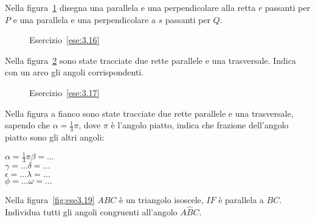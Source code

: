 \begin{esercizio}
\label{ese:3.16}
Nella figura~\ref{fig:ese3.16} disegna una parallela e una 
perpendicolare alla retta $r$ passanti per $P$ e una parallela e una 
perpendicolare a $s$ passanti per $Q$.
\end{esercizio}

\begin{inaccessibleblock}
 \begin{figure}[htb]
\centering
\caption{Esercizio~\ref{ese:3.16}}\label{fig:ese3.16}
\end{figure}
\end{inaccessibleblock}

\begin{esercizio}
\label{ese:3.17}
Nella figura~\ref{fig:ese3.17} sono state tracciate due rette 
parallele e una trasversale. Indica con un arco gli angoli 
corrispondenti.
\end{esercizio}

\begin{inaccessibleblock}
 \begin{figure}[htb]
\centering
\caption{Esercizio~\ref{ese:3.17}}\label{fig:ese3.17}
\end{figure}
\end{inaccessibleblock}

\begin{esercizio}
\label{ese:3.18}
Nella figura a fianco sono state tracciate due rette parallele e una 
trasversale, sapendo che $\alpha=\frac{1}{3}\pi$, dove $\pi$ è 
l'angolo piatto, indica che frazione dell'angolo piatto sono gli 
altri angoli:\\
\noindent\begin{minipage}{.5\textwidth}
$\alpha=\frac{1}{3}\pi$\tab\tab $\beta = \ldots$\\
$\gamma=\ldots$\tab\tab $\delta = \ldots$\\
$\epsilon=\ldots$\tab\tab $\lambda = \ldots$\\
$\phi=\ldots$\tab\tab $\omega = \ldots$
\end{minipage}\hfil
\begin{minipage}{.5\textwidth}
\centering
\end{minipage}
\end{esercizio}

\begin{esercizio}
\label{ese:3.19}
Nella figura~\ref{fig:ese3.19} $ABC$ è un triangolo isoscele, $IF$ è 
parallela a $BC$. Individua tutti gli angoli congruenti all'angolo 
$A\widehat{B}C$.
\end{esercizio}


